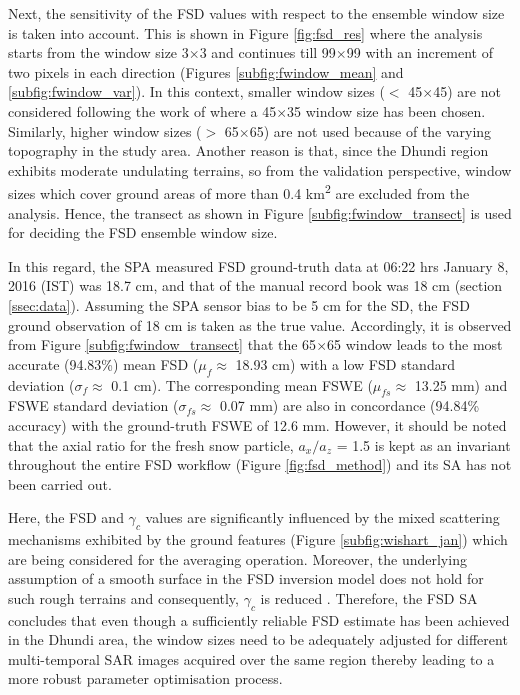 \documentclass[review]{elsarticle}
\numberwithin{equation}{section}
\numberwithin{figure}{section}
\numberwithin{table}{section}
\begin{document}
Next, the sensitivity of the FSD values with respect to the ensemble window size is taken into account. This is shown in Figure \ref{fig:fsd_res} where the analysis starts from the window size 3$\times$3 and continues till 99$\times$99 with an increment of two pixels in each direction (Figures \ref{subfig:fwindow_mean} and \ref{subfig:fwindow_var}). In this context, smaller window sizes ($<$ 45$\times$45) are not considered following the work of \cite{Leinss2014} where a 45$\times$35 window size has been chosen. Similarly, higher window sizes ($>$ 65$\times$65) are not used because of the varying topography in the study area. Another reason is that, since the Dhundi region exhibits moderate undulating terrains, so from the validation perspective, window sizes which cover ground areas of more than 0.4 km\textsuperscript{2} are excluded from the analysis. Hence, the transect as shown in Figure \ref{subfig:fwindow_transect} is used for deciding the FSD ensemble window size.

In this regard, the SPA measured FSD ground-truth data at 06:22 hrs January 8, 2016 (IST) was 18.7 cm, and that of the manual record book was 18 cm (section \ref{ssec:data}). Assuming the SPA sensor bias to be 5 cm for the SD, the FSD ground observation of 18 cm is taken as the true value. Accordingly, it is observed from Figure \ref{subfig:fwindow_transect} that the 65$\times$65 window leads to the most accurate (94.83\%) mean FSD ($\mu_f \approx$ 18.93 cm) with a low FSD standard deviation ($\sigma_f \approx$ 0.1 cm). The corresponding mean FSWE ($\mu_{fs} \approx$ 13.25 mm) and FSWE standard deviation ($\sigma_{fs} \approx$ 0.07 mm) are also in concordance (94.84\% accuracy) with the ground-truth FSWE of 12.6 mm. However, it should be noted that the axial ratio for the fresh snow particle, $a_x/a_z$ = 1.5 is kept as an invariant throughout the entire FSD workflow (Figure \ref{fig:fsd_method}) and its SA has not been carried out.

Here, the FSD and $\gamma_c$ values are significantly influenced by the mixed scattering mechanisms exhibited by
the ground features (Figure \ref{subfig:wishart_jan}) which are being considered for the averaging operation. Moreover, the
underlying assumption of a smooth surface in the FSD inversion model does not hold for such rough terrains and consequently, $\gamma_c$ is reduced \citep{Leinss2014}. Therefore, the FSD SA concludes that even though a sufficiently reliable FSD estimate has been achieved in the Dhundi area, the window sizes need to be adequately adjusted for different multi-temporal SAR images acquired over the same region thereby leading to a more robust parameter optimisation process.
\end{document}
